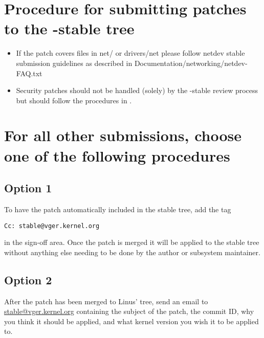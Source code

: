 \documentclass[a4paper,8pt,english]{sphinxmanual}
\begin{document}
\section{Procedure for submitting patches to the -stable tree}
\label{process/stable-kernel-rules:procedure-for-submitting-patches-to-the-stable-tree}\begin{itemize}
\item {} 
If the patch covers files in net/ or drivers/net please follow netdev stable
submission guidelines as described in
Documentation/networking/netdev-FAQ.txt

\item {} 
Security patches should not be handled (solely) by the -stable review
process but should follow the procedures in
.

\end{itemize}


\section{For all other submissions, choose one of the following procedures}
\label{process/stable-kernel-rules:for-all-other-submissions-choose-one-of-the-following-procedures}

\subsection{Option 1}
\label{process/stable-kernel-rules:option-1}\label{process/stable-kernel-rules:id1}
To have the patch automatically included in the stable tree, add the tag

\begin{Verbatim}[commandchars=\\\{\}]
Cc: stable@vger.kernel.org
\end{Verbatim}

in the sign-off area. Once the patch is merged it will be applied to
the stable tree without anything else needing to be done by the author
or subsystem maintainer.


\subsection{Option 2}
\label{process/stable-kernel-rules:id2}\label{process/stable-kernel-rules:option-2}
After the patch has been merged to Linus' tree, send an email to
\href{mailto:stable@vger.kernel.org}{stable@vger.kernel.org} containing the subject of the patch, the commit ID,
why you think it should be applied, and what kernel version you wish it to
be applied to.
\end{document}
